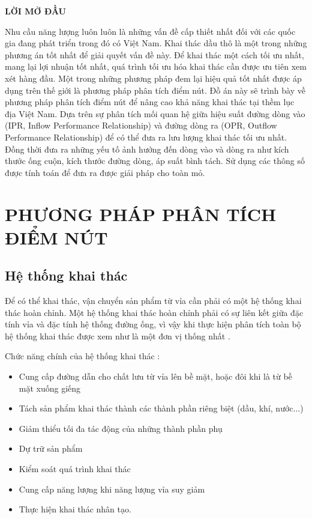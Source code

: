 \documentclass[12pt,a4paper]{report}
\begin{document}
\newpage
\begin{center}
	\centering
	\textbf{LỜI MỞ ĐẦU}
\end{center}
Nhu cầu năng lượng luôn luôn là những vấn đề cấp thiết nhất đối với các quốc gia đang phát triển trong đó có Việt Nam. Khai thác dầu thô là một trong những phương án tốt nhất để giải quyết vấn đề này. Để khai thác một cách tối ưu nhất, mang lại lợi nhuận tốt nhất, quá trình tối ưu hóa khai thác cần được ưu tiên xem xét hàng đầu. Một trong những phương pháp đem lại hiệu quả tốt nhất được áp dụng trên thế giới là phương pháp phân tích điểm nút. Đồ án này sẽ trình bày về phương pháp phân tích điểm nút để nâng cao khả năng khai thác tại thềm lục địa Việt Nam. Dựa trên sự phân tích mối quan hệ giữa hiệu suất đường dòng vào (IPR, Inflow Performance Relationship) và đường dòng ra (OPR, Outflow Performance Relationship) để có thể đưa ra lưu lượng khai thác tối ưu nhất. Đồng thời đưa ra những yếu tố ảnh hưởng đến dòng vào và dòng ra như kích thước ống cuộn, kích thước đường dòng, áp suất bình tách. Sử dụng các thông số được tính toán để đưa ra được giải pháp cho toàn mỏ.

\tableofcontents
{}

\listoffigures
{}

\listoftables
{}

\printnomenclature
{}

\clearpage
{}
\newpage

\chapter{PHƯƠNG PHÁP PHÂN TÍCH ĐIỂM NÚT}
\section{Hệ thống khai thác}
Để có thể khai thác, vận chuyển sản phẩm từ vỉa cần phải có một hệ thống khai thác hoàn chỉnh. Một hệ thống khai thác hoàn chỉnh phải có sự liên kết giữa đặc tính vỉa và đặc tính hệ thống đường ống, vì vậy khi thực hiện phân tích toàn bộ hệ thống khai thác được xem như là một đơn vị thống nhất \cite{jansen2004modelling}.

Chức năng chính của hệ thống khai thác \cite{haole2003applyreservoir}:
	\begin{itemize}
		\item Cung cấp đường dẫn cho chất lưu từ vỉa lên bề mặt, hoặc đôi khi là từ bề mặt xuống giếng
		\item Tách sản phẩm khai thác thành các thành phần riêng biệt (dầu, khí, nước...)
		\item Giảm thiểu tối đa tác động của những thành phần phụ
		\item Dự trữ sản phẩm
		\item Kiểm soát quá trình khai thác
		\item Cung cấp năng lượng khi năng lượng vỉa suy giảm
		\item Thực hiện khai thác nhân tạo.
	\end{itemize}
\end{document}
